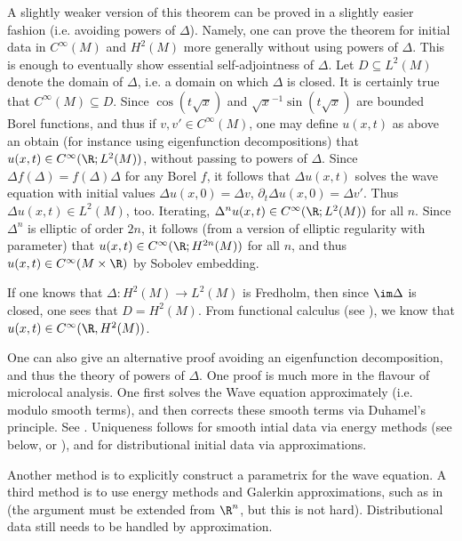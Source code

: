 \documentclass[12pt]{article}
\begin{document}
\begin{rk}\label{rk1}A slightly weaker version of this theorem can be proved in a slightly easier fashion (i.e. avoiding powers of $\Delta$). Namely, one can prove the theorem for initial data in $C^\infty(M)$ and $H^2(M)$ more generally without using powers of $\Delta$. This is enough to eventually show essential self-adjointness of $\Delta$. Let $D \subseteq L^2(M)$ denote the domain of $\Delta$, i.e. a domain on which $\Delta$ is closed. It is certainly true that $C^\infty(M) \subseteq D$. Since $\cos(t\sqrt{x})$ and $\sqrt{x}^{-1}\sin(t\sqrt{x})$ are bounded Borel functions, and thus if $v,v' \in C^\infty(M)$, one may define $u(x,t)$ as above an obtain (for instance using eigenfunction decompositions) that $u(x,t) \in C^\infty(\R;L^2(M))$, without passing to powers of $\Delta$. Since $\Delta f(\Delta) = f(\Delta)\Delta$ for any Borel $f$, it follows that $\Delta u(x,t)$ solves the wave equation with initial values $\Delta u(x,0) = \Delta v$, $\partial_t \Delta u(x,0) = \Delta v'$. Thus $\Delta u(x,t) \in L^2(M)$, too. Iterating, $\Delta^n u(x,t) \in C^\infty(\R;L^2(M))$ for all $n$. Since $\Delta^n$ is elliptic of order $2n$, it follows (from a version of elliptic regularity with parameter) that $u(x,t) \in C^\infty(\R;H^{2n}(M))$ for all $n$, and thus $u(x,t) \in C^\infty(M\times \R)$ by Sobolev embedding.

If one knows that $\Delta:H^2(M) \to L^2(M)$ is Fredholm, then since $\im \Delta$ is closed, one sees that $D = H^2(M)$. From functional calculus (see \cite{Tao}), we know that $u(x,t) \in C^\infty(\R,H^2(M))$.\end{rk}
\begin{rk}One can also give an alternative proof avoiding an eigenfunction decomposition, and thus the theory of powers of $\Delta$. One proof is much more in the flavour of microlocal analysis. One first solves the Wave equation approximately (i.e. modulo smooth terms), and then corrects these smooth terms via Duhamel's principle. See \cite[Chapter 6, Exercise 6.2]{GS}. Uniqueness follows for smooth intial data via energy methods (see below, or \cite{Tao}), and for distributional initial data via approximations.

Another method is to explicitly construct a parametrix for the wave equation. A third method is to use energy methods and Galerkin approximations, such as in \cite[Chapter 7]{Evans} (the argument must be extended from $\R^n$, but this is not hard). Distributional data still needs to be handled by approximation.\end{rk}
\end{document}

